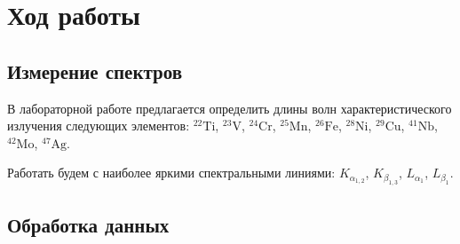\documentclass[a4paper, 12pt]{article}
\begin{document}
\section{Ход работы}
\subsection{Измерение спектров}
В лабораторной работе предлагается определить длины волн характеристического излучения следующих элементов: $^{22}\text{Ti}$, $^{23}\text{V}$, $^{24}\text{Cr}$, $^{25}\text{Mn}$, $^{26}\text{Fe}$, $^{28}\text{Ni}$, $^{29}\text{Cu}$, $^{41}\text{Nb}$, $^{42}\text{Mo}$, $^{47}\text{Ag}$.\par
Работать будем с наиболее яркими спектральными линиями: $K_{\alpha_{1,2}}$, $K_{\beta_{1,3}}$, $L_{\alpha_1}$, $L_{\beta_1}$.
\subsection{Обработка данных}
\end{document}
